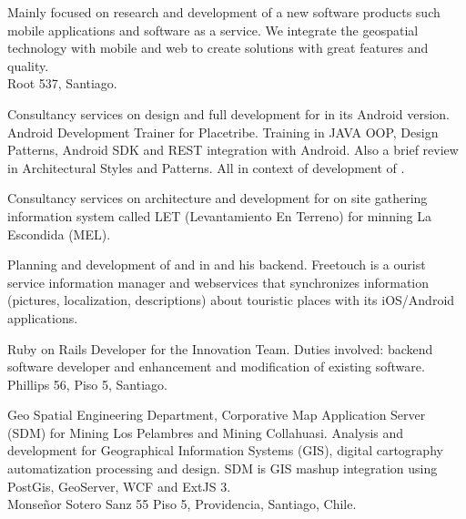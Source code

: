 \documentclass[11pt,letterpaper,roman]{moderncv}
\begin{document}
	 {\cf} {\ingennia} {\stgo} {}
	{Mainly focused on research and development of a new software products
	such mobile applications and software as a service. We integrate the geospatial
	technology with mobile and web to create solutions with great features and
	quality.
	\\ Root 537, Santiago.}

	 {\scd} {\paonde} {\stgo} {}
	{Consultancy services on design and full development for \paondeapp 
	in its Android version.
	}
	 {\tchr} {\placetribe} {\stgo} {}
	{Android Development Trainer for Placetribe. Training in JAVA
	OOP, Design Patterns, Android SDK and REST integration with Android. Also a
	brief review in Architectural Styles and Patterns. All in context of development
	of \placetribeapp.
	}



	 {\scd} {\jobbitgames} {\stgo} {}
	{Consultancy services on architecture and development for on site
	gathering information system called LET (Levantamiento En Terreno) for minning
	La Escondida (MEL).
	}

	 {\scd} {\mataveri} {\stgo} {}
	{Planning and development of \freetouchchile and \freetouchperu in
	\android and his backend.  Freetouch is a ourist service information manager and
	webservices that synchronizes information (pictures, localization, descriptions)
	about touristic places with its iOS/Android applications.
	}
	
	 {\se} {\multicaja} {\stgo} {}
	{Ruby on Rails Developer for the Innovation Team. Duties involved:
	backend software developer and enhancement and modification of existing
	software. \\
	Phillips 56, Piso 5, Santiago.
	}

	 {\se} {\ikom} {\stgo} {} {Geo Spatial Engineering
	Department, Corporative Map Application Server (SDM) for Mining Los Pelambres
	and Mining Collahuasi.  Analysis and development for Geographical Information
	Systems (GIS), digital cartography automatization processing and design.  SDM is
	GIS mashup integration using PostGis, GeoServer, WCF and ExtJS 3. 
	\\ Monse\~nor
	Sotero Sanz 55 Piso 5, Providencia, Santiago, Chile.}
\end{document}
